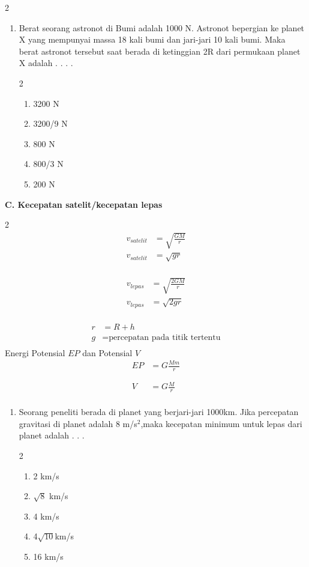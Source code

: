 \documentclass[11pt,a4paper]{article}
\newcommand{\pilgani}[1]{                            \vspace{-0.3cm}\begin{multicols}{2}
 \begin{enumerate}[label=\Alph*., itemsep=0pt,topsep=0pt,leftmargin=*,align=Center]#1                     \end{enumerate}
 \phantom{ini cuma sapi, wedus, dan ayam}
 \end{multicols}}
\newcommand{\spasi}{
    \vspace{-0.5cm}
\begin{tcolorbox} [boxrule=0.5pt,height=4.2cm, colback=white]

\end{tcolorbox}

}
\begin{document}
\begin{multicols*}{2}
\begin{enumerate}
\item Berat seorang astronot di Bumi adalah 1000 N. Astronot bepergian ke planet X yang mempunyai massa 18 kali bumi dan jari-jari 10 kali bumi. Maka berat astronot tersebut saat berada di ketinggian 2R dari permukaan planet X adalah . . . .
\pilgani {
    \item 3200 N
    \item 3200/9 N
    \item 800 N
    \item 800/3 N
    \item 200 N }
    \spasi

\end{enumerate}


\textbf{C. Kecepatan satelit/kecepatan lepas}
\begin{multicols}{2}
\vspace{-0.5cm}
\begin{align*}
v_{satelit} &= \sqrt{\frac{GM}{r}} \\
v_{satelit} &= \sqrt{gr}\\
\end{align*} 

\begin{align*}
v_{lepas} &= \sqrt{\frac{2GM}{r}} \\
v_{lepas} &= \sqrt{2gr}\\
\end{align*} 
\end{multicols}
\vspace{-1.7cm}\begin{align*}
r &= R+h\\
g &= \text{percepatan pada titik tertentu}\\
\end{align*}
Energi Potensial $EP$ dan Potensial $V$
\begin{align*}
EP &= G\frac{Mm}{r}\\
\phantom {s}\\
V &= G\frac{M}{r}\\
\end{align*}

\begin{enumerate}
\item Seorang peneliti berada di planet yang berjari-jari 1000km. Jika percepatan gravitasi di planet adalah 8 m/s$^2$,maka kecepatan minimum untuk lepas dari planet adalah . . . 
\pilgani{
    \item 2 km/s
    \item $\sqrt{8}$ km/s
    \item 4 km/s
    \item 4$\sqrt{10}$km/s
    \item 16 km/s
}
\spasi


\end{enumerate}
\end{multicols*}
\end{document}
